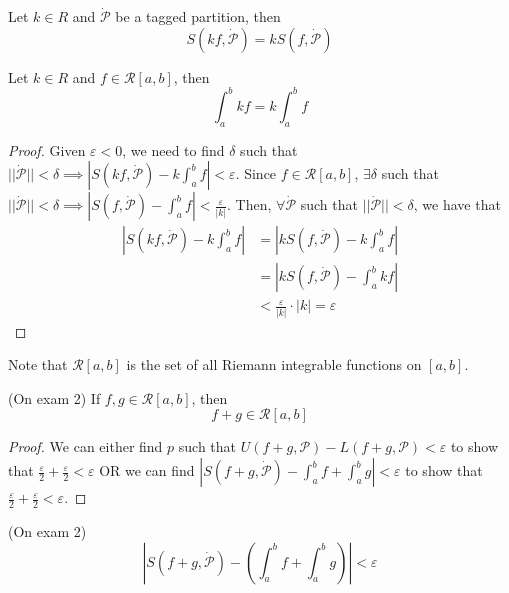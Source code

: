 \begin{lemma}
    Let $k \in R$ and $\dot{\mathcal{P}}$ be a tagged partition, then $$S(kf, \dot{\mathcal{P}}) = kS(f, \dot{\mathcal{P}})$$
\end{lemma}
\begin{theorem}
    Let $k \in R$ and $f \in \mathcal{R}[a, b]$, then $$\int_a^b kf = k \int_a^b f$$
\end{theorem}
\begin{proof}
    Given $\varepsilon < 0$, we need to find $\delta$ such that $||\dot{\mathcal{P}}|| < \delta \implies |S(kf, \dot{\mathcal{P}}) - k \int_a^b f| < \varepsilon$. Since $f \in \mathcal{R}[a, b]$, $\exists \delta$ such that $||\dot{\mathcal{P}}|| < \delta \implies |S(f, \dot{\mathcal{P}}) - \int_a^b f| < \frac{\varepsilon}{|k|}$. Then, $\forall \dot{\mathcal{P}}$ such that $||\dot{\mathcal{P}}|| < \delta$, we have that
    \begin{align*}
        \left|S(kf, \dot{\mathcal{P}}) - k \int_a^b f\right| &= \left|kS(f, \dot{\mathcal{P}}) - k \int_a^b f\right| \\
        &= \left|kS(f, \dot{\mathcal{P}}) - \int_a^b kf\right| \\
        &< \frac{\varepsilon}{|k|} \cdot |k| = \varepsilon
    \end{align*}
\end{proof}
\begin{remark}
    Note that $\mathcal{R}[a, b]$ is the set of all Riemann integrable functions on $[a, b]$.
\end{remark}

\begin{theorem}
    (On exam 2) If $f, g \in \mathcal{R}[a, b]$, then $$f + g \in \mathcal{R}[a, b]$$
\end{theorem}
\begin{proof}
    We can either find $p$ such that $U(f + g, \mathcal{P}) - L(f + g, \mathcal{P}) < \varepsilon$ to show that $\frac{\varepsilon}{2} + \frac{\varepsilon}{2} < \varepsilon$ OR we can find $|S(f + g, \dot{\mathcal{P}}) - \int_a^b f + \int_a^b g| < \varepsilon$ to show that $\frac{\varepsilon}{2} + \frac{\varepsilon}{2} < \varepsilon$.
\end{proof}

\begin{theorem}
    (On exam 2) $$\left|S(f + g, \dot{\mathcal{P}}) - \left(\int_a^b f + \int_a^b g\right)\right| < \varepsilon$$
\end{theorem}
